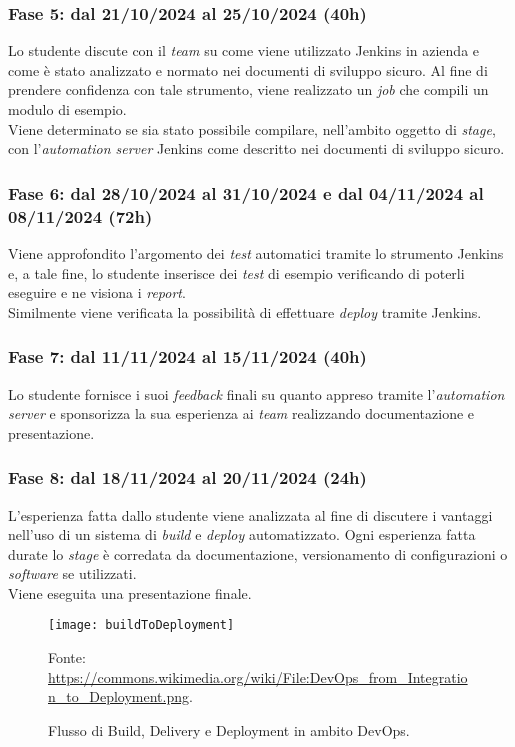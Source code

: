 \subsubsection*{Fase 5: dal 21/10/2024 al 25/10/2024 (40h) }
Lo studente discute con il \emph{team} su come viene utilizzato Jenkins in azienda e come è stato analizzato e normato nei documenti di sviluppo sicuro. Al fine di prendere confidenza con tale strumento, viene realizzato un \emph{job} che compili un modulo di esempio.\\
Viene determinato se sia stato possibile compilare, nell'ambito oggetto di \emph{stage}, con l'\emph{automation server} Jenkins come descritto nei documenti di sviluppo sicuro.

\subsubsection*{Fase 6: dal 28/10/2024 al 31/10/2024 e dal 04/11/2024 al 08/11/2024 (72h)}
Viene approfondito l'argomento dei \emph{test} automatici tramite lo strumento Jenkins e, a tale fine, lo studente inserisce dei \emph{test} di esempio verificando di poterli eseguire e ne visiona i \emph{report}.\\
Similmente viene verificata la possibilità di effettuare \emph{deploy} tramite Jenkins.

\subsubsection*{Fase 7: dal 11/11/2024 al 15/11/2024 (40h) }
Lo studente fornisce i suoi \emph{feedback} finali su quanto appreso tramite l'\emph{automation server} e sponsorizza la sua esperienza ai \emph{team} realizzando documentazione e presentazione.

\subsubsection*{Fase 8: dal 18/11/2024 al 20/11/2024 (24h) }
L'esperienza fatta dallo studente viene analizzata al fine di discutere i vantaggi nell'uso di un sistema di \emph{build} e \emph{deploy} automatizzato. Ogni esperienza fatta durate lo \emph{stage} è corredata da documentazione, versionamento di configurazioni o \emph{software} se utilizzati.\\
Viene eseguita una presentazione finale.\\
\begin{figure}[htbp] 
    \centering 
    \texttt{[image: buildToDeployment]}
    \caption{Flusso di Build, Delivery e Deployment in ambito DevOps.} 
    \label{fig:buildToDeployment}
    \vspace{1mm}
    Fonte: \url{https://commons.wikimedia.org/wiki/File:DevOps_from_Integration_to_Deployment.png}.
\end{figure}

